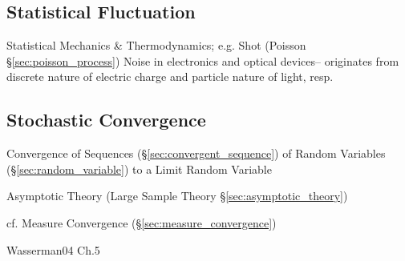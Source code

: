 \subsection{Statistical Fluctuation}\label{sec:statistical_fluctuation}

Statistical Mechanics \& Thermodynamics; e.g. Shot (Poisson
\S\ref{sec:poisson_process}) Noise in electronics and optical devices--
originates from discrete nature of electric charge and particle nature of light,
resp.



\subsection{Stochastic Convergence}\label{sec:stochastic_convergence}

Convergence of Sequences (\S\ref{sec:convergent_sequence}) of Random Variables
(\S\ref{sec:random_variable}) to a Limit Random Variable

\fist Asymptotic Theory (Large Sample Theory \S\ref{sec:asymptotic_theory})

\fist cf. Measure Convergence (\S\ref{sec:measure_convergence})

Wasserman04 Ch.5

